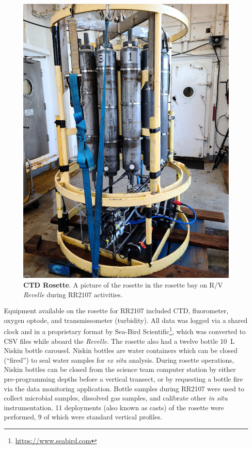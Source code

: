\begin{figure}[h!]
  \centering
  \includegraphics[width=0.8\columnwidth, angle=-90]{figures/ops_rosette.jpg}
  \caption[CTD Rosette.]{\textbf{CTD Rosette}. A picture of the rosette in the rosette bay on R/V \emph{Revelle} during RR2107 activities.}
  \label{fig:ops_rosette}
\end{figure}


Equipment available on the rosette for RR2107 included CTD, fluorometer, oxygen optode, and transmissometer (turbidity). All data was logged via a shared clock and in a proprietary format by Sea-Bird Scientific\footnote{\url{https://www.seabird.com}}, which was converted to CSV files while aboard the \emph{Revelle}. The rosette also had a twelve bottle \SI{10}{\liter} Niskin bottle carousel. Niskin bottles are water containers which can be closed (``fired'') to seal water samples for \emph{ex situ} analysis. During rosette operations, Niskin bottles can be closed from the science team computer station by either pre-programming depths before a vertical transect, or by requesting a bottle fire via the data monitoring application. Bottle samples during RR2107 were used to collect microbial samples, dissolved gas samples, and calibrate other \emph{in situ} instrumentation. 11 deployments (also known as casts) of the rosette were performed, 9 of which were standard vertical profiles. 


